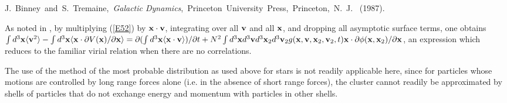 \begin{thebibliography}{10}
 J.~Binney~and~S.~Tremaine,~{\it Galactic Dynamics},~Princeton~University~Press,~Princeton,~N.~J.~ (1987).



 As noted in \cite{R8}, by multiplying (\ref{E52}) by ${\bf x}\cdot{\bf v}$, integrating over all ${\bf v}$ and all ${\bf x}$, and dropping all asymptotic surface terms, one obtains $\int d^3{\bf x}\langle {\bf v}^2 \rangle-\int d^3{\bf x}\langle {\bf x}\cdot \partial V({\bf x})/\partial {\bf x}\rangle=\partial(\int d^3{\bf x} \langle{\bf x}\cdot{\bf v}\rangle)/\partial t+N^2\int d^3{\bf x}d^3{\bf v}d^3{\bf x}_2d^3{\bf v}_2g({\bf x},{\bf v},{\bf x}_2,{\bf v}_2,t){\bf x}\cdot\partial\phi({\bf x},{\bf x}_2)/\partial {\bf x}$, an expression which reduces to the familiar virial relation when there are no correlations.

 The use of the method of the most probable distribution as used above for stars is not readily applicable here, since for particles whose motions are controlled by long range forces alone (i.e. in the absence of short range forces), the cluster cannot readily be approximated by shells of particles that do not  exchange energy and momentum with particles in other shells.



\end{thebibliography}
